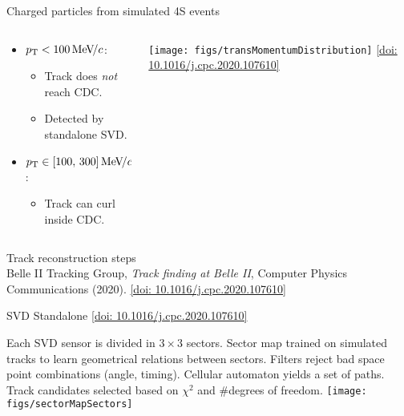 \begin{frame}{Charged particles from simulated \Y4S events}
\begin{columns}
\begin{column}{0.5\linewidth} 
\begin{itemize} 
\item $p_{\mathrm{T}}<100{\mathrm{\,Me\kern -0.1em V\!/}c}$:
\vspace{0.2cm}
\begin{itemize}
\item Track does \emph{not} reach CDC.
\item Detected by standalone SVD.
\vspace{0.4cm}
\end{itemize}
\item $p_{\mathrm{T}}\in[100,\,300]{\mathrm{\,Me\kern -0.1em V\!/}c}$:
\vspace{0.2cm}
\begin{itemize}
\item Track can curl inside CDC.
\vspace{0.5cm}
\end{itemize}
\end{itemize}
\end{column}
\begin{column}{0.5\linewidth}
\texttt{[image: figs/transMomentumDistribution]}
\vspace{0.5cm}
\hfill
\href{https://www.sciencedirect.com/science/article/pii/S0010465520302861}{\tiny \color{blue!40!gray}[doi: 10.1016/j.cpc.2020.107610]}
\end{column}
\end{columns}
\end{frame}
\begin{frame}{Track reconstruction steps\\ {\tiny Belle II Tracking Group, \emph{Track finding at Belle II}, Computer Physics Communications (2020). \href{https://www.sciencedirect.com/science/article/pii/S0010465520302861}{\color{blue!40!gray}[doi: 10.1016/j.cpc.2020.107610]}}}
\centering
{}
\end{frame}
\begin{frame}{SVD Standalone \hfill {\small \href{https://www.sciencedirect.com/science/article/pii/S0010465520302861}{\color{blue!40!gray}[doi: 10.1016/j.cpc.2020.107610]}}}
\bi
\item Each SVD sensor is divided in $3\times3$ sectors. 
\itemiii Sector map trained on simulated tracks to learn geometrical relations between sectors.
\itemiii Filters reject bad space point combinations (angle, timing).
\itemiii Cellular automaton yields a set of paths.
\itemiii Track candidates selected based on $\chi^2$ and \#degrees of freedom.
\ei
\centering
\texttt{[image: figs/sectorMapSectors]}  
\end{frame}
